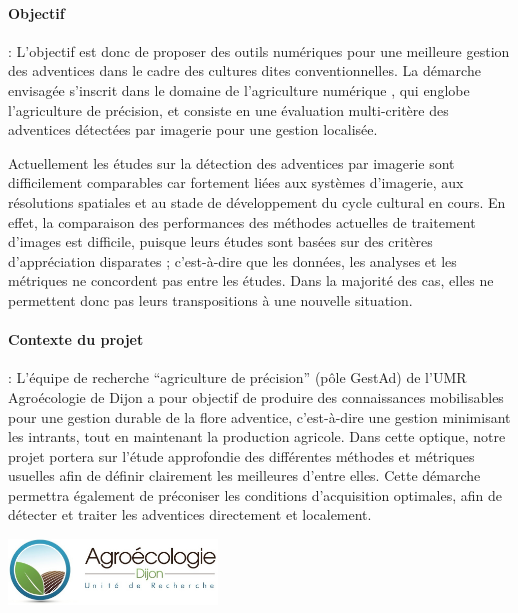 \documentclass[../thesis.tex]{subfiles}
\begin{document}
    
    \paragraph{Objectif} : L'objectif est donc de proposer des outils numériques pour une meilleure gestion des adventices dans le cadre des cultures dites conventionnelles. La démarche envisagée s'inscrit dans le domaine de l'agriculture numérique \cite{bellonmaurel:hal-02373921}, qui englobe l'agriculture de précision, et consiste en une évaluation multi-critère des adventices détectées par imagerie pour une gestion localisée.
    
    \par Actuellement les études sur la détection des adventices par imagerie sont difficilement comparables car fortement liées aux systèmes d'imagerie, aux résolutions spatiales et au stade de développement du cycle cultural en cours. En effet, la comparaison des performances des méthodes actuelles de traitement d'images est difficile, puisque leurs études sont basées sur des critères d'appréciation disparates ; c'est-à-dire que les données, les analyses et les métriques ne concordent pas entre les études. Dans la majorité des cas, elles ne permettent donc pas leurs transpositions à une nouvelle situation.
    
    \newpage\thispagestyle{empty} 
    \paragraph{Contexte du projet} : L'équipe de recherche ``agriculture de précision'' (pôle GestAd) de l'UMR Agroécologie de Dijon a pour objectif de produire des connaissances mobilisables pour une gestion durable de la flore adventice, c'est-à-dire une gestion minimisant les intrants, tout en maintenant la production agricole. Dans cette optique, notre projet portera sur l'étude approfondie des différentes méthodes et métriques usuelles afin de définir clairement les meilleures d'entre elles. Cette démarche permettra également de préconiser les conditions d'acquisition optimales, afin de détecter et traiter les adventices directement et localement.
    
    \begin{center}
        \vspace{2em}
        \includegraphics[height=1.75cm]{img/covers/agroecolo}
    \end{center}
    
\end{document}
